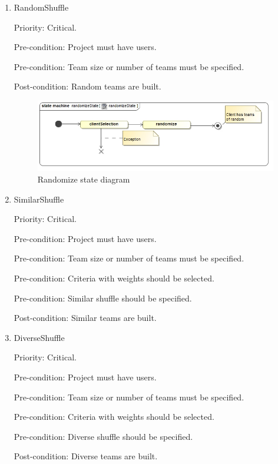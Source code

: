 \begin{enumerate}
\item RandomShuffle\par
Priority: Critical.\par
Pre-condition: Project must have users.\par
Pre-condition: Team size or number of teams must be specified.\par
Post-condition: Random teams are built.\par
    \begin{figure}[H]
        \centering
        \includegraphics[width=15cm]{./graphics/randomizeState.jpg}
        \caption{Randomize state diagram}
    \end{figure}

\item SimilarShuffle\par
Priority: Critical.\par
Pre-condition: Project must have users.\par
Pre-condition: Team size or number of teams must be specified.\par
Pre-condition: Criteria with weights should be selected.\par
Pre-condition: Similar shuffle should be specified.\par
Post-condition: Similar teams are built.\par

\item DiverseShuffle\par
Priority: Critical.\par
Pre-condition: Project must have users.\par
Pre-condition: Team size or number of teams must be specified.\par
Pre-condition: Criteria with weights should be selected.\par
Pre-condition: Diverse shuffle should be specified.\par
Post-condition: Diverse teams are built.\par

\end{enumerate}
\pagebreak
